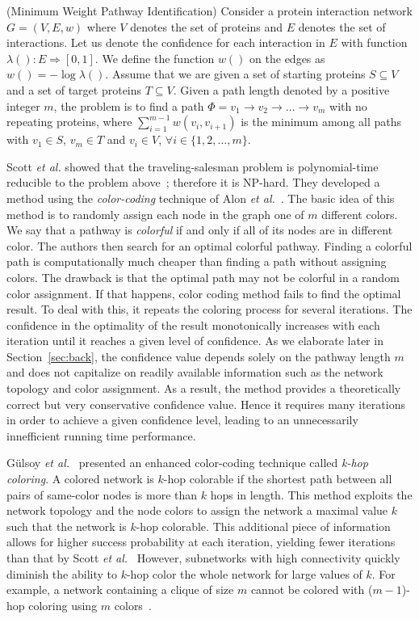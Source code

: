 \documentclass{ws-procs11x85}
\begin{document}
 {\sc (Minimum Weight Pathway Identification)}
Consider a protein interaction network $G = (V, E, w)$ where $V$
denotes the set of proteins and $E$ denotes the set of interactions.
Let us denote the confidence for each interaction in $E$ with function
$\lambda(): E \Rightarrow [0, 1]$. We define the function $w()$ on the
edges as $w() = -\log \lambda ()$.  Assume that we are given a set of
starting proteins $S \subseteq V$ and a set of target proteins $T
\subseteq V$. Given a path length denoted by a positive integer $m$,
the problem is to find a path $\Phi = v_1 \rightarrow v_2 \rightarrow
\ldots \rightarrow v_m$ with no repeating proteins, where
$\sum_{i=1}^{m-1} w(v_i, v_{i+1})$ is the minimum among all paths with
$v_1 \in S$, $v_m \in T$ and $v_i \in V$, $\forall i \in \{1, 2,
\ldots , m\}$.

Scott {\it et al.} showed that the traveling-salesman problem is
polynomial-time reducible to the problem above~\cite{scott}; therefore
it is NP-hard. They developed a method using the \emph{color-coding}
technique of Alon {\it et al.}~\cite{alon}. The basic idea of this method is
to randomly assign each node in the graph one of $m$ different colors.
We say that a pathway is {\em colorful} if and only if all of its
nodes are in different color. The authors then search for an optimal
colorful pathway.  Finding a colorful path is computationally much
cheaper than finding a path without assigning colors. The drawback is
that the optimal path may not be colorful in a random color
assignment. If that happens, color coding method fails to find the
optimal result. To deal with this, it repeats the coloring process for
several iterations.  The confidence in the optimality of the result
monotonically increases with each iteration until it reaches a given
level of confidence. As we elaborate later in
Section~\ref{sec:back}, the confidence value depends solely on the
pathway length $m$ and does not capitalize on readily available
information such as the network topology and color assignment. As a
result, the method provides a theoretically correct but very
conservative confidence value.  Hence it requires many iterations in
order to achieve a given confidence level, leading to an unnecessarily
innefficient running time performance.

G{\"u}lsoy {\it et al.}~\cite{gulsoy} presented an enhanced color-coding
technique called \textit{k-hop coloring}. A colored network is $k$-hop
colorable if the shortest path between all pairs of same-color nodes
is more than $k$ hops in length. This method exploits the network
topology and the node colors to assign the network a maximal value $k$
such that the network is $k$-hop colorable.  This additional piece of
information allows for higher success probability at each iteration,
yielding fewer iterations than that by Scott {\it et al.}~\cite{scott} However,
subnetworks with high connectivity quickly diminish the ability to
$k$-hop color the whole network for large values of $k$. For example,
a network containing a clique of size $m$ cannot be colored with
($m-1$)-hop coloring using $m$ colors~\cite{gulsoy}.
\end{document}
